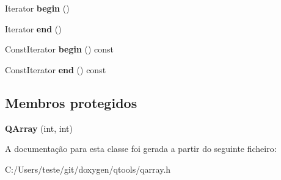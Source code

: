 \begin{DoxyCompactItemize}
\item 
\hypertarget{class_q_array_a2387033802383edbdc95f9bbb12a707e}{Iterator {\bfseries begin} ()}\label{class_q_array_a2387033802383edbdc95f9bbb12a707e}

\item 
\hypertarget{class_q_array_ab45dae688fc5d8983727abffa4389003}{Iterator {\bfseries end} ()}\label{class_q_array_ab45dae688fc5d8983727abffa4389003}

\item 
\hypertarget{class_q_array_aeb8a08dab209e7d8bd94ea796e8055e7}{Const\-Iterator {\bfseries begin} () const }\label{class_q_array_aeb8a08dab209e7d8bd94ea796e8055e7}

\item 
\hypertarget{class_q_array_afd94c820b193c151ddbaae99185a24f4}{Const\-Iterator {\bfseries end} () const }\label{class_q_array_afd94c820b193c151ddbaae99185a24f4}

\end{DoxyCompactItemize}
\subsection*{Membros protegidos}
\begin{DoxyCompactItemize}
\item 
\hypertarget{class_q_array_ae0aa2f6d5b541d61852fe51ae9f6db57}{{\bfseries Q\-Array} (int, int)}\label{class_q_array_ae0aa2f6d5b541d61852fe51ae9f6db57}

\end{DoxyCompactItemize}


A documentação para esta classe foi gerada a partir do seguinte ficheiro\-:\begin{DoxyCompactItemize}
\item 
C\-:/\-Users/teste/git/doxygen/qtools/qarray.\-h\end{DoxyCompactItemize}

